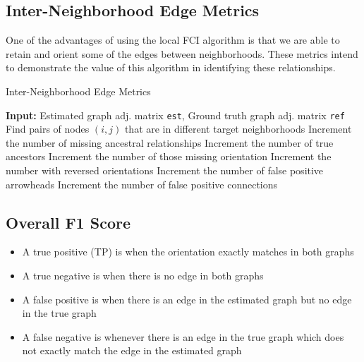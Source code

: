 \documentclass[12pt]{article}\usepackage[]{graphicx}\usepackage[]{color}
\begin{document}
\subsection*{Inter-Neighborhood Edge Metrics}

One of the advantages of using the local FCI algorithm is that we are able to retain and orient some of the edges between neighborhoods. These metrics intend to demonstrate the value of this algorithm in identifying these relationships.

\begin{algorithm}[H]
\footnotesize
\caption{Inter-Neighborhood Edge Metrics}
\begin{algorithmic}[1]
\State \textbf{Input:} Estimated graph adj. matrix \texttt{est}, Ground truth graph adj. matrix \texttt{ref}
\State Find pairs of nodes $(i,j)$ that are in different target neighborhoods
\State Increment the number of missing ancestral relationships
\EndIf
\Else
{}
\State Increment the number of true ancestors
\State Increment the number of those missing orientation
\State Increment the number with reversed orientations
\State Increment the number of false positive arrowheads
\Else 
\State Increment the number of false positive connections
\EndIf
\EndIf
\end{algorithmic}
\end{algorithm}

\subsection*{Overall F1 Score}
\begin{itemize}
\item A true positive (TP) is when the orientation exactly matches in both graphs
\item A true negative is when there is no edge in both graphs
\item A false positive is when there is an edge in the estimated graph but no edge in the true graph
\item A false negative is whenever there is an edge in the true graph which does not exactly match the edge in the estimated graph
\end{itemize}
\end{document}

